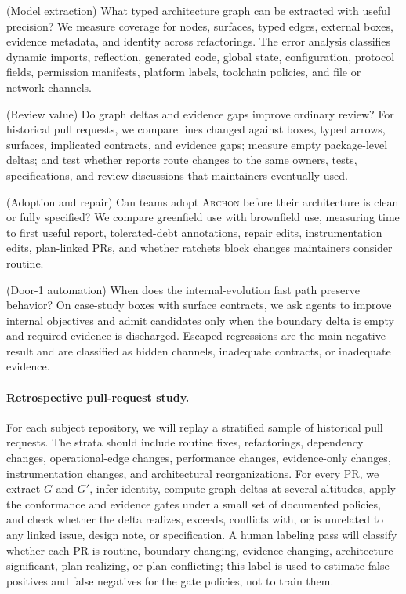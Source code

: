 \documentclass[sigconf,review,anonymous]{acmart}
\theoremstyle{plain}
\theoremstyle{definition}
\begin{document}
\begin{description}[leftmargin=2.6em,itemsep=3pt,topsep=2pt,style=sameline]
\item[\textbf{RQ1}] (Model extraction) What typed architecture graph can be
extracted with useful precision? We measure coverage for nodes, surfaces, typed
edges, external boxes, evidence metadata, and identity across refactorings. The
error analysis classifies dynamic imports, reflection, generated code, global
state, configuration, protocol fields, permission manifests, platform labels,
toolchain policies, and file or network channels.
\item[\textbf{RQ2}] (Review value) Do graph deltas and evidence gaps improve
ordinary review? For historical pull requests, we compare lines changed against
boxes, typed arrows, surfaces, implicated contracts, and evidence gaps; measure
empty package-level deltas; and test whether reports route changes to the same
owners, tests, specifications, and review discussions that maintainers
eventually used.
\item[\textbf{RQ3}] (Adoption and repair) Can teams adopt \textsc{Archon} before
their architecture is clean or fully specified? We compare greenfield use with
brownfield use, measuring time to first useful report, tolerated-debt
annotations, repair edits, instrumentation edits, plan-linked PRs, and whether
ratchets block changes maintainers consider routine.
\item[\textbf{RQ4}] (Door-1 automation) When does the internal-evolution fast
path preserve behavior? On case-study boxes with surface contracts, we ask
agents to improve internal objectives and admit candidates only when the
boundary delta is empty and required evidence is discharged. Escaped regressions
are the main negative result and are classified as hidden channels, inadequate
contracts, or inadequate evidence.
\end{description}

\paragraph{Retrospective pull-request study.}
For each subject repository, we will replay a stratified sample of historical
pull requests. The strata should include routine fixes, refactorings, dependency
changes, operational-edge changes, performance changes, evidence-only changes,
instrumentation changes, and architectural reorganizations. For every PR, we
extract $G$ and $G'$, infer identity, compute graph deltas at several altitudes,
apply the conformance and evidence gates under a small set of documented
policies, and check whether the delta realizes, exceeds, conflicts with, or is
unrelated to any linked issue, design note, or specification. A human labeling
pass will classify whether each PR is routine, boundary-changing,
evidence-changing, architecture-significant, plan-realizing, or plan-conflicting;
this label is used to estimate false positives and false negatives for the gate
policies, not to train them.
\end{document}
